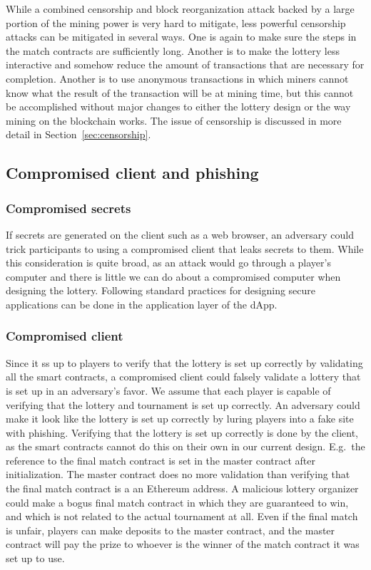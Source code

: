 While a combined censorship and block reorganization attack backed by a large portion of the mining power is very hard to mitigate, less powerful censorship attacks can be mitigated in several ways. One is again to make sure the steps in the match contracts are sufficiently long. Another is to make the lottery less interactive and somehow reduce the amount of transactions that are necessary for completion. Another is to use anonymous transactions in which miners cannot know what the result of the transaction will be at mining time, but this cannot be accomplished without major changes to either the lottery design or the way mining on the blockchain works. The issue of censorship is discussed in more detail in Section~\ref{sec:censorship}.

\subsection{Compromised client and phishing}

\subsubsection{Compromised secrets}
If secrets are generated on the client such as a web browser, an adversary could trick participants to using a compromised client that leaks secrets to them. While this consideration is quite broad, as an attack would go through a player's computer and there is little we can do about a compromised computer when designing the lottery. Following standard practices for designing secure applications can be done in the application layer of the dApp.

\subsubsection{Compromised client}
Since it ss up to players to verify that the lottery is set up correctly by validating all the smart contracts, a compromised client could falsely validate a lottery that is set up in an adversary's favor. We assume that each player is capable of verifying that the lottery and tournament is set up correctly. An adversary could make it look like the lottery is set up correctly by luring players into a fake site with phishing. Verifying that the lottery is set up correctly is done by the client, as the smart contracts cannot do this on their own in our current design. E.g.~the reference to the final match contract is set in the master contract after initialization. The master contract does no more validation than verifying that the final match contract is a an Ethereum address. A malicious lottery organizer could make a bogus final match contract in which they are guaranteed to win, and which is not related to the actual tournament at all. Even if the final match is unfair, players can make deposits to the master contract, and the master contract will pay the prize to whoever is the winner of the match contract it was set up to use.

